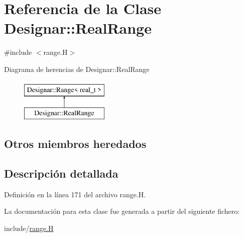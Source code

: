 \hypertarget{class_designar_1_1_real_range}{}\section{Referencia de la Clase Designar\+:\+:Real\+Range}
\label{class_designar_1_1_real_range}


{\ttfamily \#include $<$range.\+H$>$}

Diagrama de herencias de Designar\+:\+:Real\+Range\begin{figure}[H]
\begin{center}
\leavevmode
\includegraphics[height=2.000000cm]{class_designar_1_1_real_range}
\end{center}
\end{figure}
\subsection*{Otros miembros heredados}


\subsection{Descripción detallada}


Definición en la línea 171 del archivo range.\+H.



La documentación para esta clase fue generada a partir del siguiente fichero\+:\begin{DoxyCompactItemize}
\item 
include/\hyperlink{range_8_h}{range.\+H}\end{DoxyCompactItemize}
